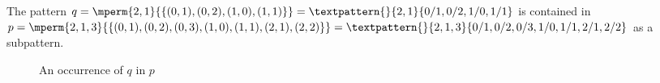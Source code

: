 \begin{frame}
  \begin{example}
      The pattern \(q=\mperm{2,1}{\{(0,1),(0,2),(1,0),(1,1)\}}=
      \textpattern{}{ 2, 1 }{ 0/1, 0/2, 1/0, 1/1}\) is contained in
      \(p=\mperm{2,1,3}{\{(0,1),(0,2),(0,3),(1,0),(1,1),(2,1),(2,2)\}}=
      \textpattern{}{ 2, 1, 3 }{ 0/1, 0/2,0/3, 1/0, 1/1, 2/1, 2/2 }\) as a
      subpattern.
      \begin{figure}[htb]
        \centering
      \caption{ An occurrence of \(q\) in \(p\) }
      \end{figure}
  \end{example}
\end{frame}
